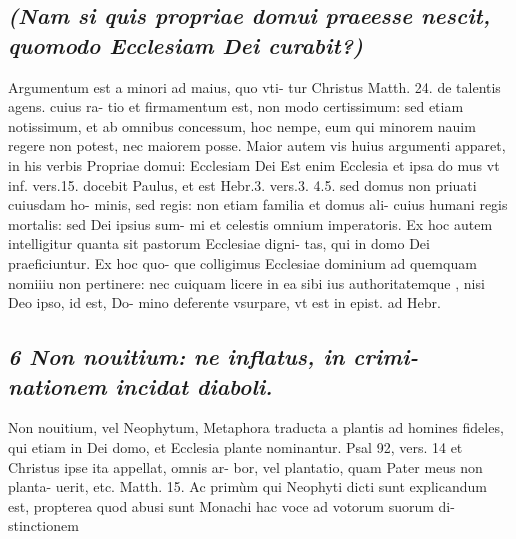 \documentclass{article}
\begin{document}
\begin{pages}
\subsection*{\textit{(Nam si quis propriae domui praeesse nescit, quomodo Ecclesiam Dei curabit?) }}\pstart Argumentum est a minori ad maius, quo vti- tur Christus Matth. 24. de talentis agens. cuius ra- tio et firmamentum est, non modo certissimum: sed etiam notissimum, et ab omnibus concessum, hoc nempe, eum qui minorem nauim regere non potest, nec maiorem posse. Maior autem vis huius argumenti apparet, in his verbis Propriae domui: Ecclesiam Dei Est enim Ecclesia et ipsa do mus vt inf. vers.15. docebit Paulus, et est Hebr.3. vers.3. 4.5. sed domus non priuati cuiusdam ho- minis, sed regis: non etiam familia et domus ali- cuius humani regis mortalis: sed Dei ipsius sum- mi et celestis omnium imperatoris. Ex hoc autem intelligitur quanta sit pastorum Ecclesiae digni- tas, qui in domo Dei praeficiuntur. Ex hoc quo- que colligimus Ecclesiae dominium ad quemquam nomiiiu non pertinere: nec cuiquam licere in ea sibi ius authoritatemque , nisi Deo ipso, id est, Do- mino deferente vsurpare, vt est in epist. ad Hebr.  \pend
{}
{}
\subsection*{\textit{6 Non nouitium: ne inflatus, in crimi- nationem incidat diaboli. }}\pstart Non nouitium, vel Neophytum, Metaphora traducta a plantis ad homines fideles, qui etiam in Dei domo, et Ecclesia plante nominantur. Psal 92, vers. 14 et Christus ipse ita appellat, omnis ar- bor, vel plantatio, quam Pater meus non planta- uerit, etc. Matth. 15. Ac primùm qui Neophyti dicti sunt explicandum est, propterea quod abusi sunt Monachi hac voce ad votorum suorum di- stinctionem  \pend

\end{pages}
\end{document}
